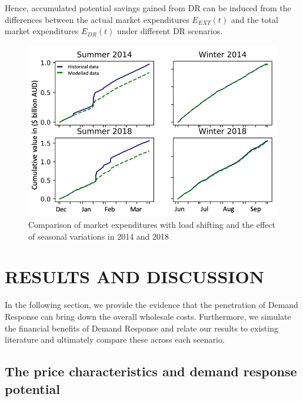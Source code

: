 \documentclass{pasa}%
\begin{document}
Hence, accumulated potential savings gained from DR can be induced from the differences between the actual market expenditures $E_{EXT} (t)$ and the total market expenditures $E_{DR} (t)$ under different DR scenarios.

\begin{figure}
\begin{center}
\includegraphics[width=.9\textwidth,height=.5\textheight,keepaspectratio]{DR/PASA_example/Figures_DR/Cumsea01.png}
\caption{Comparison of market expenditures with load shifting and the effect of seasonal variations in 2014 and 2018}\label{fig:Figseasonal}
\end{center}
\end{figure}

\section{RESULTS AND DISCUSSION}

In the following section, we provide the evidence that the penetration of Demand Response can bring down the overall wholesale costs. Furthermore, we simulate the financial benefits of Demand Response and relate our results to existing literature and ultimately compare these across each scenario.


\subsection{The price characteristics and demand response potential}
\label{sec:dis5.1}
\end{document}
